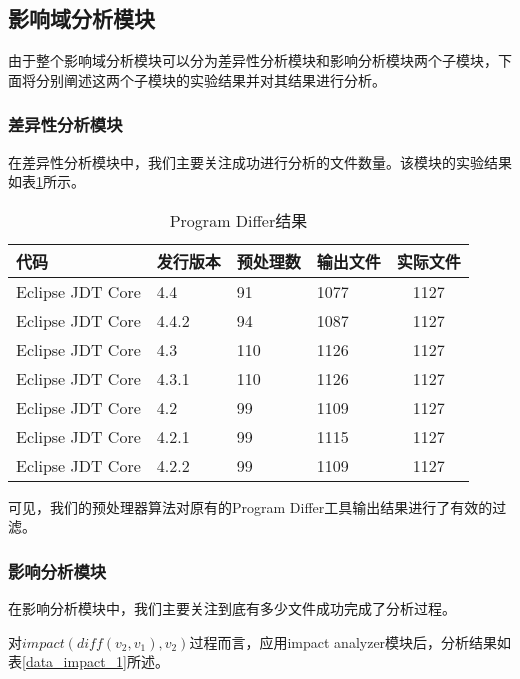 \subsection{影响域分析模块}

由于整个影响域分析模块可以分为差异性分析模块和影响分析模块两个子模块，下面将分别阐述这两个子模块的实验结果并对其结果进行分析。

\subsubsection{差异性分析模块}

在差异性分析模块中，我们主要关注成功进行分析的文件数量。该模块的实验结果如表\ref {data_differ_1}所示。

\begin{table}[H]
	\caption{Program Differ结果}
	\label{data_differ_1}
	\centering
	\begin{tabular}{llllc}
		\toprule[1.5pt]
		{\heiti 代码} & {\heiti 发行版本} & {\heiti 预处理数} & {\heiti 输出文件} & {\heiti 实际文件} \\\midrule[1pt]
		Eclipse JDT Core & 4.4	& 91 & 1077 & 1127	\\		
		Eclipse JDT Core & 4.4.2 & 94 & 1087 & 1127		\\
		Eclipse JDT Core & 4.3 	& 110 & 1126 & 1127			\\
		Eclipse JDT Core & 4.3.1 & 110 & 1126 & 1127			\\
		Eclipse JDT Core & 4.2 	& 99 & 1109 & 1127		\\
		Eclipse JDT Core & 4.2.1 & 99 & 1115 & 1127			\\
		Eclipse JDT Core & 4.2.2 & 99 & 1109 & 1127		\\
		\bottomrule[1.5pt]
	\end{tabular}
\end{table}

可见，我们的预处理器算法对原有的Program Differ工具输出结果进行了有效的过滤。

\subsubsection{影响分析模块}

在影响分析模块中，我们主要关注到底有多少文件成功完成了分析过程。

对$impact(diff(v_2,v_1),v_2)$过程而言，应用impact analyzer模块后，分析结果如表\ref {data_impact_1}所述。

